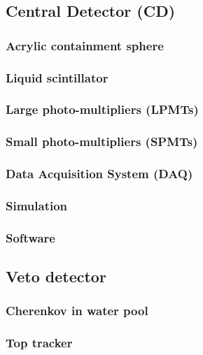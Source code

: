 \subsection{Central Detector (CD)}

\subsubsection{Acrylic containment sphere}

\subsubsection{Liquid scintillator}

\subsubsection{Large photo-multipliers (LPMTs)}

\subsubsection{Small photo-multipliers (SPMTs)}

\subsubsection{Data Acquisition System (DAQ)}

\subsubsection{Simulation}

\subsubsection{Software}



\subsection{Veto detector}

\subsubsection{Cherenkov in water pool}

\subsubsection{Top tracker}

